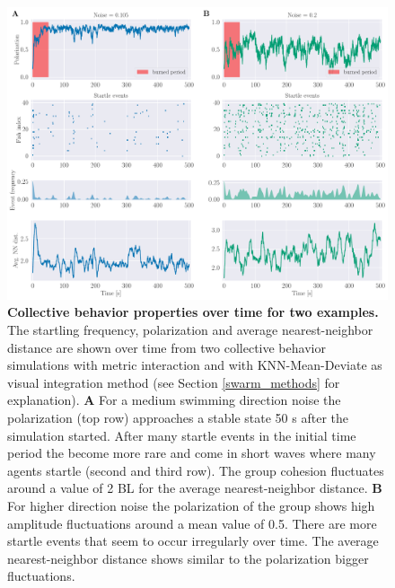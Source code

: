     \begin{figure}[H]
    \begin{center}
    \includegraphics[width=\textwidth]{looming_swarm_over_time.pdf}
    \end{center}
    \caption{\textbf{Collective behavior properties over time for two examples.} The startling frequency, polarization and average nearest-neighbor distance are shown over time from two collective behavior simulations with metric interaction and with KNN-Mean-Deviate as visual integration method (see Section \ref{swarm_methods} for explanation). \textbf{A} For a medium swimming direction noise the polarization (top row) approaches a stable state 50 s after the simulation started. After many startle events in the initial time period the become more rare and come in short waves where many agents startle (second and third row). The group cohesion fluctuates around a value of 2 BL for the average nearest-neighbor distance. \textbf{B} For higher direction noise the polarization of the group shows high amplitude fluctuations around a mean value of 0.5. There are more startle events that seem to occur irregularly over time. The average nearest-neighbor distance shows similar to the polarization bigger fluctuations.}
    \label{fig:swarm_over_time}
    \end{figure}
    
